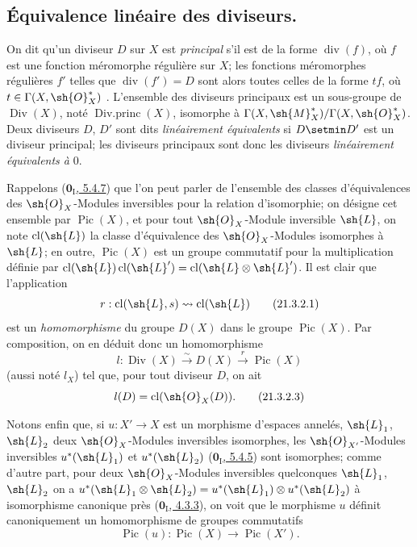 
\subsection{Équivalence linéaire des diviseurs.}

\begin{env}[21.3.1]
On dit qu'un diviseur $D$ sur $X$ est \emph{principal} s'il est de la forme $\operatorname{div}(f)$, où $f$ est une fonction méromorphe régulière sur $X$;
les fonctions méromorphes régulières $f'$ telles que $\operatorname{div}(f')=D$ sont alors toutes celles de la forme $tf$, où $t\in\Gamma(X,\sh{O}_X^*)$ .
L'ensemble des diviseurs principaux est un sous-groupe de $\operatorname{Div}(X)$, noté $\operatorname{Div.princ}(X)$, isomorphe à $\Gamma(X,\sh{M}_X^*)/\Gamma(X,\sh{O}_X^*)$.
Deux diviseurs $D$, $D'$ sont dits \emph{linéairement équivalents} si $D\setmin D'$ est un diviseur principal;
les diviseurs principaux sont donc les diviseurs \emph{linéairement équivalents à} $0$.
\end{env}

\begin{env}[21.3.2]
\label{IV.21.3.2}
Rappelons (\hyperref[0.5.4.7]{$\mathbf{0}_{\mathrm I}$, 5.4.7}) que l'on peut parler de l'ensemble des classes d'équivalences des $\sh{O}_X$-Modules inversibles pour la relation d'isomorphie;
on désigne cet ensemble par $\operatorname{Pic}(X)$, et pour tout $\sh{O}_X$-Module inversible $\sh{L}$, on note $\operatorname{cl}(\sh{L})$ la classe d'équivalence des $\sh{O}_X$-Modules isomorphes à $\sh{L}$;
en outre, $\operatorname{Pic}(X)$ est un groupe commutatif pour la multiplication définie par $\operatorname{cl}(\sh{L})\operatorname{cl}(\sh{L}')=\operatorname{cl}(\sh{L}\otimes\sh{L}')$.
Il est clair que l'application
\[
\label{IV.21.3.2.1}
  r:\operatorname{cl}(\sh{L},s)\leadsto\operatorname{cl}(\sh{L})
  \tag{21.3.2.1}
\]
est un \emph{homomorphisme} du groupe $D(X)$  dans le groupe $\operatorname{Pic}(X)$.
Par composition, on en déduit donc un homomorphisme
\[
\label{IV.21.3.2.2}
  l:\operatorname{Div}(X)\xrightarrow{\sim}D(X)\xrightarrow{r}\operatorname{Pic}(X)
  \tag{21.3.2.2}
\]
(aussi noté $l_X$) tel que, pour tout diviseur $D$, on ait
\[
\label{IV.21.3.2.3}
  l(D)=\operatorname{cl}(\sh{O}_X(D)).
  \tag{21.3.2.3}
\]

Notons enfin que, si $u:X'\to X$ est un morphisme d'espaces annelés, $\sh{L}_1$, $\sh{L}_2$ deux $\sh{O}_X$-Modules inversibles isomorphes, les $\sh{O}_{X'}$-Modules inversibles $u^*(\sh{L}_1)$ et $u^*(\sh{L}_2)$ (\hyperref[0.5.4.5]{$\mathbf{0}_{\mathrm I}$, 5.4.5}) sont isomorphes;
comme d'autre part, pour deux $\sh{O}_X$-Modules inversibles quelconques $\sh{L}_1$, $\sh{L}_2$ on a $u^*(\sh{L}_1\otimes\sh{L}_2)=u^*(\sh{L}_1)\otimes u^*(\sh{L}_2)$ à isomorphisme canonique près (\hyperref[0.4.3.3]{$\mathbf{0}_{\mathrm I}$, 4.3.3}), on voit que le morphisme $u$ définit canoniquement un homomorphisme de groupes commutatifs
\[
\label{IV.21.3.2.4}
  \operatorname{Pic}(u):\operatorname{Pic}(X)\to\operatorname{Pic}(X').
  \tag{21.3.2.4}
\]
\end{env}

